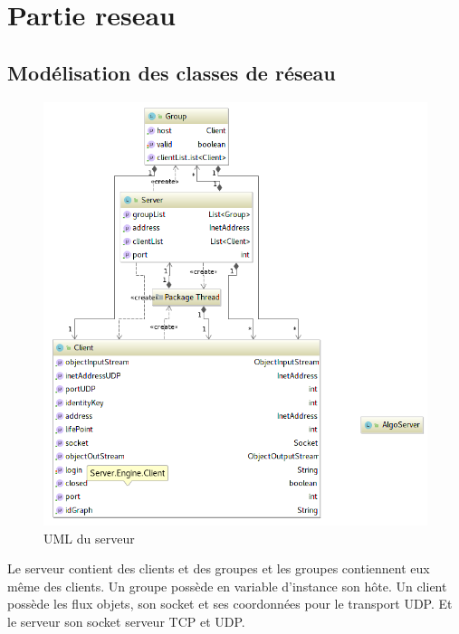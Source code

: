 \documentclass[a4paper,11pt]{report}
\title{}
\author{}
\begin{document}
\maketitle
\tableofcontents

\begin{abstract}
\end{abstract}

\chapter{Partie reseau}

\section{Modélisation des classes de réseau}

    \begin{figure}[th]
      \begin{center}
        \includegraphics[scale=0.6]{Assets/UML_serveur.png}
        \caption{UML du serveur}
        \label{UML du serveur}
      \end{center}
    \end{figure}
    
    Le serveur contient des clients et des groupes et les groupes contiennent eux même des clients.
Un groupe possède en variable d’instance son hôte. 
Un client possède les flux objets, son socket et ses coordonnées pour le transport UDP.
Et le serveur son socket serveur TCP et UDP.
\end{document}
